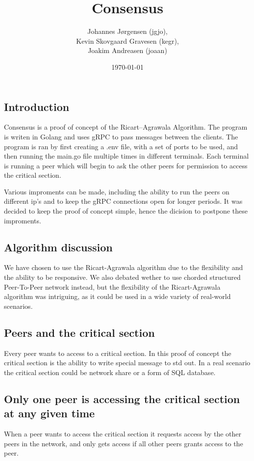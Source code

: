 \documentclass[a4paper,11pt]{article}
\title{Consensus}
\author{Johannes Jørgensen (jgjo),\\ Kevin Skovgaard Gravesen (kegr),\\ Joakim Andreasen (joaan)}
\date{\today}
\begin{document}
 

\maketitle

\subsection*{Introduction}
Consensus is a proof of concept of the Ricart–Agrawala Algorithm. The program is writen in Golang and uses gRPC to pass messages between the clients.
The program is ran by first creating a .env file, with a set of ports to be used, and then running the main.go file multiple times in different terminals.
Each terminal is running a peer which will begin to ask the other peers for permission to access the critical section.

Various improments can be made, including the ability to run the peers on different ip's and to keep the gRPC connections open for longer periods.
It was decided to keep the proof of concept simple, hence the dicision to postpone these improments.

\subsection*{Algorithm discussion}
We have chosen to use the Ricart-Agrawala algorithm due to the flexibility and the ability to be responsive. We also debated wether to use chorded structured Peer-To-Peer
network instead, but the flexibility of the Ricart-Agrawala algorithm was intriguing, as it could be used in a wide variety of real-world scenarios.

\subsection*{Peers and the critical section}
Every peer wants to access to a critical section. In this proof of concept the critical section is the ability to write special message to std out.
In a real scenario the critical section could be network share or a form of SQL database.

\subsection*{Only one peer is accessing the critical section at any given time}
When a peer wants to access the critical section it requests access by the other peers in the network, and only gets access if all other peers grants access to the peer.
\end{document}
